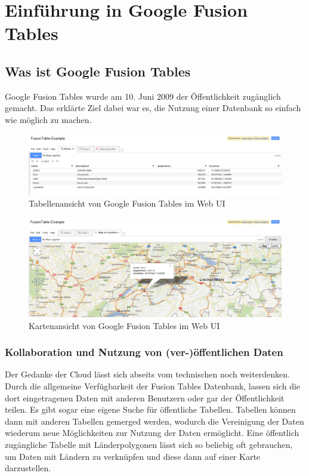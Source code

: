 \chapter{Einführung in Google Fusion Tables}
\label{einfuehrung}

\section{Was ist Google Fusion Tables}
Google Fusion Tables wurde am 10. Juni 2009 der Öffentlichkeit zugänglich gemacht\cite{fusion-table-announce}. Das erklärte Ziel dabei war es, die Nutzung einer Datenbank so einfach wie möglich zu machen.

\begin{figure}[!ht]
	\centering
	\includegraphics[width=\textwidth]{images/einfuehrung/gft-webgui-table}
	\caption{Tabellenansicht von Google Fusion Tables im Web UI}
	\label{gft-webgui-table}
\end{figure}

\begin{figure}[!ht]
	\centering
	\includegraphics[width=\textwidth]{images/einfuehrung/gft-webgui-map}
	\caption{Kartenansicht von Google Fusion Tables im Web UI}
	\label{gft-webgui-map}
\end{figure}

\subsection{Kollaboration und Nutzung von (ver-)öffentlichen Daten}
Der Gedanke der \gls{Cloud} lässt sich abseits vom technischen noch weiterdenken. Durch die allgemeine Verfügbarkeit der Fusion Tables Datenbank, lassen sich die dort eingetragenen Daten mit anderen Benutzern oder gar der Öffentlichkeit teilen. Es gibt sogar eine eigene Suche für öffentliche Tabellen.\cite{fusion-tables-search} Tabellen können dann mit anderen Tabellen gemerged werden, wodurch die Vereinigung der Daten wiederum neue Möglichkeiten zur Nutzung der Daten ermöglicht. Eine öffentlich zugängliche Tabelle mit Länderpolygonen lässt sich so beliebig oft gebrauchen, um Daten mit Ländern zu verknüpfen und diese dann auf einer Karte darzustellen.

